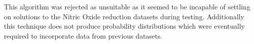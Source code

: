 
This algorithm was rejected as unsuitable as it seemed to be incapable of settling on solutions to the Nitric Oxide reduction datasets during testing. Additionally this technique does not produce probability distributions which were eventually required to incorporate data from previous datasets.


